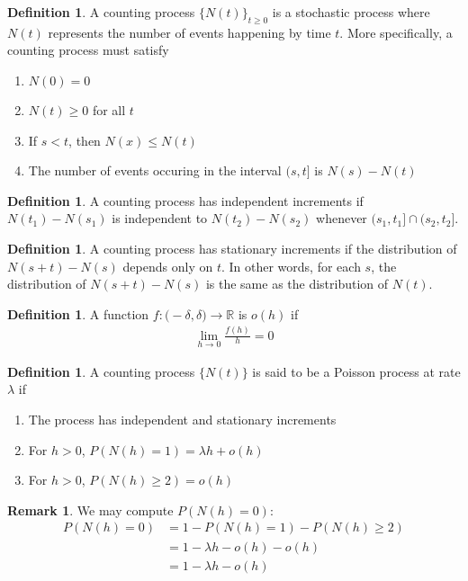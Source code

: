 \documentclass[11pt]{amsart}
\theoremstyle{definition}
\newtheorem{definition}[theorem]{Definition}
\newtheorem{remark}[theorem]{Remark}
\numberwithin{equation}{section}
\begin{document}
 \begin{definition}
     A counting process $\{N(t)\}_{t\ge 0}$ is a stochastic process where $N(t)$ represents the number of events happening by time $t$. More specifically, a counting process must satisfy
     \begin{enumerate}
         \item $N(0)=0$
         \item $N(t)\ge 0$ for all $t$
         \item If $s< t$, then $N(x)\le N(t)$
         \item The number of events occuring in the interval $(s,t]$ is $N(s)-N(t)$
     \end{enumerate}
 \end{definition}
 \begin{definition}
     A counting process has independent increments if $N(t_1)-N(s_1)$ is independent to $N(t_2)-N(s_2)$ whenever $(s_1,t_1]\cap (s_2,t_2]$.
 \end{definition}
 \begin{definition}
     A counting process has stationary increments if the distribution of $N(s+t)-N(s)$ depends only on $t$. In other words, for each $s$, the distribution of $N(s+t)-N(s)$ is the same as the distribution of $N(t)$.
 \end{definition}
 \begin{definition}
     A function $f:\mathbb (-\delta,\delta)\to\mathbb R$ is $o(h)$ if 
     \begin{align*}
         \lim_{h\to0}\frac{f(h)}{h}=0
     \end{align*}
 \end{definition}
 \begin{definition}
     A counting process $\{N(t)\}$ is said to be a Poisson process at rate $\lambda$ if
     \begin{enumerate}
         \item The process has independent and stationary increments
         \item For $h>0$, $P(N(h)=1)=\lambda h+o(h)$
         \item For $h>0$, $P(N(h)\ge 2)=o(h)$
     \end{enumerate}
 \end{definition}
 \begin{remark}
     We may compute $P(N(h)=0)$:
     \begin{align*}
         P(N(h)=0)&=1-P(N(h)=1)-P(N(h)\ge 2)\\
         &=1-\lambda h-o(h)-o(h)\\
         &=1-\lambda h-o(h)
     \end{align*}
 \end{remark}
\end{document}

